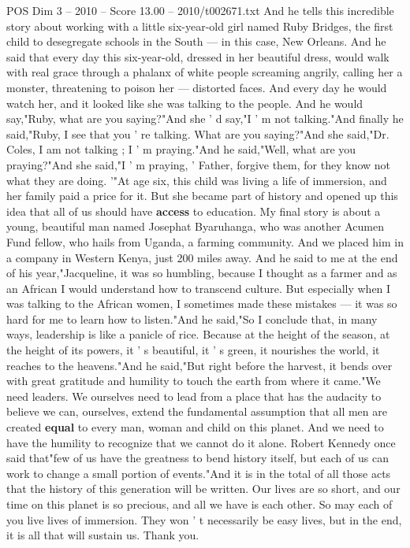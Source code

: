 \begin{textsample}{POS Dim 3 – 2010 – Score 13.00 – 2010/t002671.txt}
And he tells this incredible story about working with a little six-year-old girl named Ruby Bridges, the first child to desegregate schools in the South — in this case, New Orleans.
And he said that every day this six-year-old, dressed in her beautiful dress, would walk with real grace through a phalanx of white people screaming angrily, calling her a monster, threatening to poison her — distorted faces.
And every day he would watch her, and it looked like she was talking to the people.
And he would say,"Ruby, what are you saying?"And she ' d say,"I ' m not talking."And finally he said,"Ruby, I see that you ' re talking.
What are you saying?"And she said,"Dr.
Coles, I am not talking ; I ' m praying."And he said,"Well, what are you praying?"And she said,"I ' m praying, ' Father, forgive them, for they know not what they are doing. '"At age six, this child was living a life of immersion, and her family paid a price for it.
But she became part of history and opened up this idea that all of us should have \textbf{access} to education.
My final story is about a young, beautiful man named Josephat Byaruhanga, who was another Acumen Fund fellow, who hails from Uganda, a farming community.
And we placed him in a company in Western Kenya, just 200 miles away.
And he said to me at the end of his year,"Jacqueline, it was so humbling, because I thought as a farmer and as an African I would understand how to transcend culture.
But especially when I was talking to the African women, I sometimes made these mistakes — it was so hard for me to learn how to listen."And he said,"So I conclude that, in many ways, leadership is like a panicle of rice.
Because at the height of the season, at the height of its powers, it ' s beautiful, it ' s green, it nourishes the world, it reaches to the heavens."And he said,"But right before the harvest, it bends over with great gratitude and humility to touch the earth from where it came."We need leaders.
We ourselves need to lead from a place that has the audacity to believe we can, ourselves, extend the fundamental assumption that all men are created \textbf{equal} to every man, woman and child on this planet.
And we need to have the humility to recognize that we cannot do it alone.
Robert Kennedy once said that"few of us have the greatness to bend history itself, but each of us can work to change a small portion of events."And it is in the total of all those acts that the history of this generation will be written.
Our lives are so short, and our time on this planet is so precious, and all we have is each other.
So may each of you live lives of immersion.
They won ' t necessarily be easy lives, but in the end, it is all that will sustain us.
Thank you.

\end{textsample}
